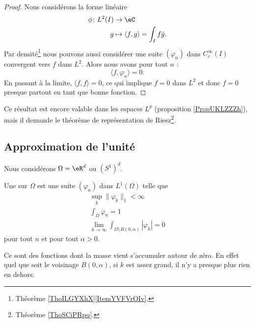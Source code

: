 \begin{proof}
    Nous considérons la forme linéaire
    \begin{equation}
        \begin{aligned}
            \phi\colon L^2(I)&\to \eC \\
            g&\mapsto \langle f, g\rangle=\int_If\bar g .
        \end{aligned}
    \end{equation}
    Par densité\footnote{Théorème \ref{ThoILGYXhX}\ref{ItemYVFVrOIv}.} nous pouvons aussi considérer une suite \( (\varphi_n)\) dans \(  C^{\infty}_c(I)\) convergent vers \( f\) dans \( L^2\). Alors nous avons pour tout \( n\) :
    \begin{equation}
        \langle f, \varphi_n\rangle =0.
    \end{equation}
    En passant à la limite, \( \langle f, f\rangle =0\), ce qui implique \( f=0\) dans \( L^2\) et donc \( f=0\) presque partout en tant que bonne fonction.
\end{proof}
Ce résultat est encore valable dans les espaces \( L^p\) (proposition \ref{PropUKLZZZh}), mais il demande le théorème de représentation de Riesz\footnote{Théorème \ref{ThoSCiPRpq}.}.

\subsection{Approximation de l'unité}

Nous considérons \( \Omega=\eR^d\) ou \( (S^1)^d\).

\begin{definition}
    Une  sur \( \Omega\) est une suite \( (\varphi_n)\) dans \( L^1(\Omega)\) telle que
    \begin{subequations}
        \begin{align}
            \sup_k \| \varphi_k \|_1 <\infty\\
            \int_{\Omega}\varphi_n=1        \label{subeqAQcisBt}\\
            \lim_{k\to \infty} \int_{\Omega\setminus B(0,\alpha)}| \varphi_k |=0
        \end{align}
    \end{subequations}
    pour tout \( n\) et pour tout \( \alpha>0\).
\end{definition}
Ce sont des fonctions dont la masse vient s'accumuler autour de zéro. En effet quel que soit le voisinage \( B(0,\alpha)\), si \( k\) est assez grand, il n'y a presque plus rien en dehors.

